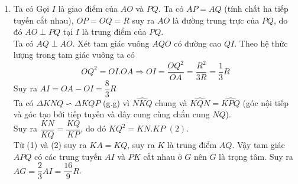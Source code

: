 \begin{ex}
{\begin{enumerate}
        Ta có $\Delta AKN \backsim \Delta PKA $ vì $\widehat{AKP}$ chung và $\widehat{APN}=\widehat{NAK}$ (cmt).\\
        Do đó $\dfrac{KA}{KP}=\dfrac{KN}{KA}$ suy ra  $KA^2=KN.KP \,\, (1)$.
        \item Ta có
       Gọi $I$ là giao điểm của $AO$ và $PQ$. Ta có $AP=AQ$ (tính chất ha tiếp tuyến cắt nhau), $OP=OQ=R$ suy ra $AO$ là đường trung trực của $PQ$, do đó $AO \perp PQ$ tại $I$ là trung điểm của $PQ$.\\
       Ta có $AQ \perp AO$. Xét tam giác vuông $AQO$ có đường cao $QI$. Theo hệ thức lượng trong tam giác vuông ta có
       $$OQ^2=OI.OA \Rightarrow OI=\dfrac{OQ^2}{OA}=\dfrac{R^2}{3R}=\dfrac{1}{3}R$$
       Suy ra $AI=OA-OI=\dfrac{8}{3}R$\\
       Ta có $\Delta KNQ \backsim \Delta KQP$ (g.g) vì $\widehat{NKQ}$ chung và  $\widehat{KQN}=\widehat{KPQ}$ (góc nội tiếp và góc tạo bởi tiếp tuyến và dây cung cùng chắn cung $NQ$).\\
       Suy ra $\dfrac{KN}{KQ}=\dfrac{KQ}{KP}$, do đó  $KQ^2=KN.KP \,\, (2)$.\\
       Từ (1) và (2) suy ra $KA=KQ$, suy ra $K$ là trung điểm $AQ$.
       Vậy tam giác $APQ$ có các trung tuyến $AI$ và $PK$ cắt nhau ở $G$ nên $G$ là trọng tâm.
       Suy ra $AG=\dfrac{2}{3}AI=\dfrac{16}{9}R$.
    \end{enumerate}
    }
\end{ex}

